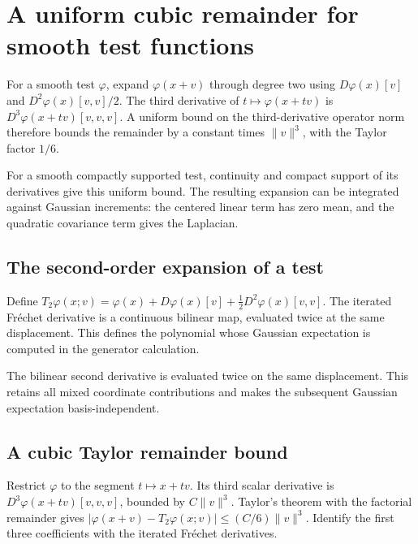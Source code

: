\documentclass[11pt,a4paper]{report}
\begin{document}
\section{\texorpdfstring{A uniform cubic remainder for smooth test functions}{A uniform cubic remainder for smooth test functions}}
\label{proof-module-UnadjustedLangevin-WeakForwardTaylor-lean}


For a smooth test \(\varphi\), expand \(\varphi(x+v)\) through degree two using \(D\varphi(x)[v]\) and \(D^2\varphi(x)[v,v]/2\). The third derivative of \(t\mapsto\varphi(x+tv)\) is \(D^3\varphi(x+tv)[v,v,v]\). A uniform bound on the third-derivative operator norm therefore bounds the remainder by a constant times \(\|v\|^3\), with the Taylor factor \(1/6\).



For a smooth compactly supported test, continuity and compact support of its derivatives give this uniform bound. The resulting expansion can be integrated against Gaussian increments: the centered linear term has zero mean, and the quadratic covariance term gives the Laplacian.

\subsection{\texorpdfstring{The second-order expansion of a test}{The second-order expansion of a test}}
\label{report-step-UnadjustedLangevin-WeakForwardTaylor-lean-1}


Define \(T_2\varphi(x;v)=\varphi(x)+D\varphi(x)[v]+\frac12D^2\varphi(x)[v,v]\). The iterated Fréchet derivative is a continuous bilinear map, evaluated twice at the same displacement. This defines the polynomial whose Gaussian expectation is computed in the generator calculation.



The bilinear second derivative is evaluated twice on the same displacement. This retains all mixed coordinate contributions and makes the subsequent Gaussian expectation basis-independent.

\subsection{\texorpdfstring{A cubic Taylor remainder bound}{A cubic Taylor remainder bound}}
\label{report-step-UnadjustedLangevin-WeakForwardTaylor-lean-2}


Restrict \(\varphi\) to the segment \(t\mapsto x+tv\). Its third scalar derivative is \(D^3\varphi(x+tv)[v,v,v]\), bounded by \(C\|v\|^3\). Taylor's theorem with the factorial remainder gives \(|\varphi(x+v)-T_2\varphi(x;v)|\le(C/6)\|v\|^3\). Identify the first three coefficients with the iterated Fréchet derivatives.
\end{document}

